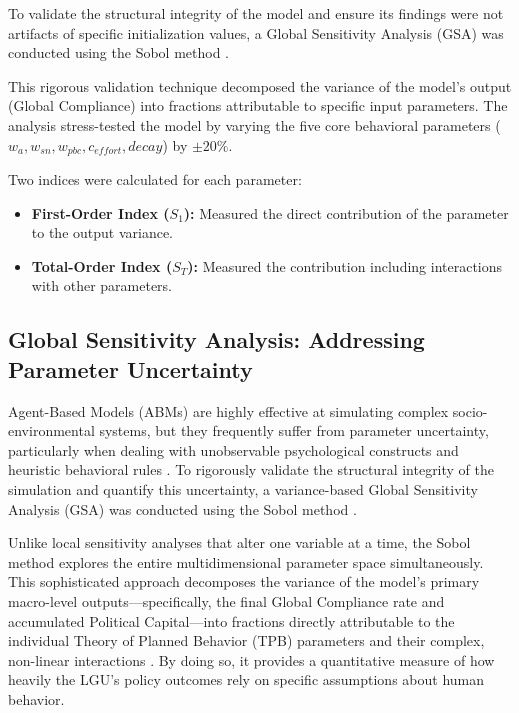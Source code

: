 To validate the structural integrity of the model and ensure its findings were not artifacts of specific initialization values, a Global Sensitivity Analysis (GSA) was conducted using the Sobol method \citep{Sobol2001}.

This rigorous validation technique decomposed the variance of the model's output (Global Compliance) into fractions attributable to specific input parameters. The analysis stress-tested the model by varying the five core behavioral parameters ($w_a, w_{sn}, w_{pbc}, c_{effort}, decay$) by $\pm 20\%$.

Two indices were calculated for each parameter:
\begin{itemize}
    \item \textbf{First-Order Index ($S_1$):} Measured the direct contribution of the parameter to the output variance.
    \item \textbf{Total-Order Index ($S_T$):} Measured the contribution including interactions with other parameters.
\end{itemize}

\subsection{Global Sensitivity Analysis: Addressing Parameter Uncertainty}

Agent-Based Models (ABMs) are highly effective at simulating complex socio-environmental systems, but they frequently suffer from parameter uncertainty, particularly when dealing with unobservable psychological constructs and heuristic behavioral rules \citep{McCulloch2022}. To rigorously validate the structural integrity of the simulation and quantify this uncertainty, a variance-based Global Sensitivity Analysis (GSA) was conducted using the Sobol method \citep{Sobol2001}. 



Unlike local sensitivity analyses that alter one variable at a time, the Sobol method explores the entire multidimensional parameter space simultaneously. This sophisticated approach decomposes the variance of the model's primary macro-level outputs—specifically, the final Global Compliance rate and accumulated Political Capital—into fractions directly attributable to the individual Theory of Planned Behavior (TPB) parameters and their complex, non-linear interactions \citep{Zheng2022a}. By doing so, it provides a quantitative measure of how heavily the LGU's policy outcomes rely on specific assumptions about human behavior.

